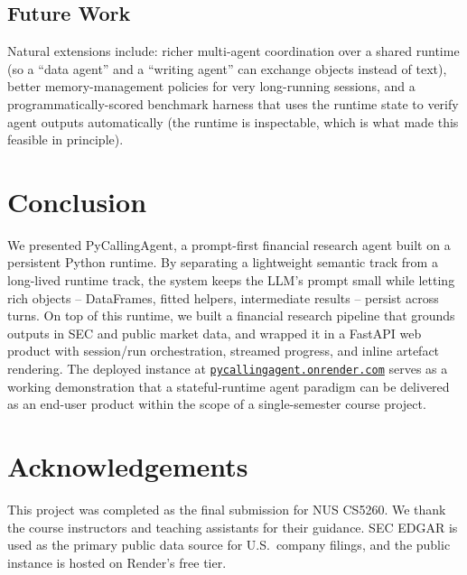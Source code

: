 \documentclass[11pt,a4paper]{article}
\begin{document}
\subsection{Future Work}

Natural extensions include: richer multi-agent coordination over a shared runtime (so a ``data agent'' and a ``writing agent'' can exchange objects instead of text), better memory-management policies for very long-running sessions, and a programmatically-scored benchmark harness that uses the runtime state to verify agent outputs automatically (the runtime is inspectable, which is what made this feasible in principle).

\section{Conclusion}

We presented PyCallingAgent, a prompt-first financial research agent built on a persistent Python runtime. By separating a lightweight semantic track from a long-lived runtime track, the system keeps the LLM's prompt small while letting rich objects -- DataFrames, fitted helpers, intermediate results -- persist across turns. On top of this runtime, we built a financial research pipeline that grounds outputs in SEC and public market data, and wrapped it in a FastAPI web product with session/run orchestration, streamed progress, and inline artefact rendering. The deployed instance at \href{https://pycallingagent.onrender.com}{\texttt{pycallingagent.onrender.com}} serves as a working demonstration that a stateful-runtime agent paradigm can be delivered as an end-user product within the scope of a single-semester course project.

\section*{Acknowledgements}

This project was completed as the final submission for NUS CS5260. We thank the course instructors and teaching assistants for their guidance. SEC EDGAR is used as the primary public data source for U.S.\ company filings, and the public instance is hosted on Render's free tier.

\bigskip
\noindent{}
\end{document}
